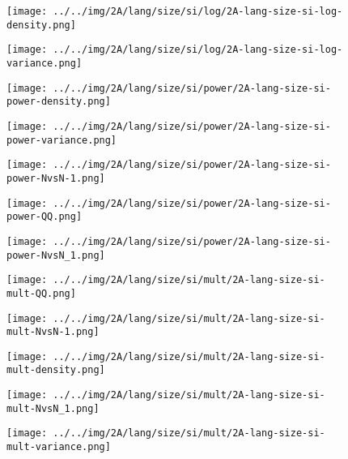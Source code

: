 \begin{figure}[H]
\centering	\texttt{[image: ../../img/2A/lang/size/si/log/2A-lang-size-si-log-density.png]}
\end{figure}
\begin{figure}[H]
\centering	\texttt{[image: ../../img/2A/lang/size/si/log/2A-lang-size-si-log-variance.png]}
\end{figure}
\begin{figure}[H]
\centering	\texttt{[image: ../../img/2A/lang/size/si/power/2A-lang-size-si-power-density.png]}
\end{figure}
\begin{figure}[H]
\centering	\texttt{[image: ../../img/2A/lang/size/si/power/2A-lang-size-si-power-variance.png]}
\end{figure}
\begin{figure}[H]
\centering	\texttt{[image: ../../img/2A/lang/size/si/power/2A-lang-size-si-power-NvsN-1.png]}
\end{figure}
\begin{figure}[H]
\centering	\texttt{[image: ../../img/2A/lang/size/si/power/2A-lang-size-si-power-QQ.png]}
\end{figure}
\begin{figure}[H]
\centering	\texttt{[image: ../../img/2A/lang/size/si/power/2A-lang-size-si-power-NvsN\_1.png]}
\end{figure}
\begin{figure}[H]
\centering	\texttt{[image: ../../img/2A/lang/size/si/mult/2A-lang-size-si-mult-QQ.png]}
\end{figure}
\begin{figure}[H]
\centering	\texttt{[image: ../../img/2A/lang/size/si/mult/2A-lang-size-si-mult-NvsN-1.png]}
\end{figure}
\begin{figure}[H]
\centering	\texttt{[image: ../../img/2A/lang/size/si/mult/2A-lang-size-si-mult-density.png]}
\end{figure}
\begin{figure}[H]
\centering	\texttt{[image: ../../img/2A/lang/size/si/mult/2A-lang-size-si-mult-NvsN\_1.png]}
\end{figure}
\begin{figure}[H]
\centering	\texttt{[image: ../../img/2A/lang/size/si/mult/2A-lang-size-si-mult-variance.png]}
\end{figure}
